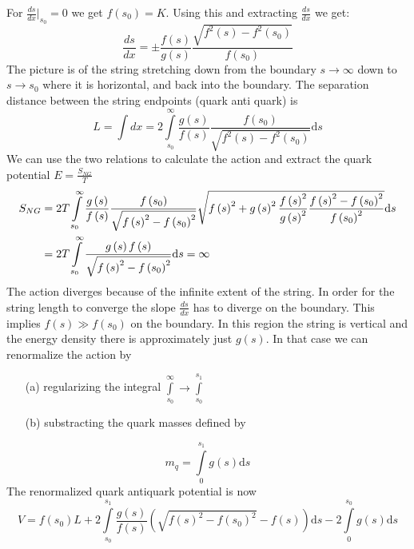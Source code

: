 \documentclass[11pt,a4paper]{article}
\begin{document}
For $\frac{ds}{dx}|_{s_0}=0$ we get $f\left(s_0\right)=K$. Using this and extracting $\frac{ds}{dx}$ we get:
\begin{equation}
\frac{ds}{dx}=\pm\frac{f\left(s\right)}{g\left(s\right)} \frac{\sqrt{f^2\left(s\right)-f^2\left(s_0\right)}}{f\left(s_0\right)}
\end{equation}
The picture is of the string stretching down from the boundary $s\rightarrow\infty$ down to $s\rightarrow s_0$ where it is horizontal, and back into the boundary. The separation distance between the string endpoints (quark anti quark) is
\begin{equation}
\label{eq:stringseperation}
L=\int dx=2\int\limits_{s_0}^{\infty} \frac{g\left(s\right)}{f\left(s\right)} \frac{f\left(s_0\right)}{\sqrt{f^2\left(s\right)-f^2\left(s_0\right)}} \mathrm{d}s
\end{equation}
We can use the two relations to calculate the action and extract the quark potential $E=\frac{S_{NG}}{T}$
\begin{align}
S_{NG}&=2T\int\limits_{s_0}^{\infty} \frac{g\left(s\right)}{f\left(s\right)} \frac{f\left(s_0\right)}{\sqrt{f\left(s\right)^2-f\left(s_0\right)^2}} \sqrt{f\left(s\right)^2+g\left(s\right)^2\frac{f\left(s\right)^2}{g\left(s\right)^2} \frac{f\left(s\right)^2-f\left(s_0\right)^2}{f\left(s_0\right)^2}}\mathrm{d}s \notag \\
&=2T\int\limits_{s_0}^{\infty} \frac{g\left(s\right)f\left(s\right)}{\sqrt{f\left(s\right)^2-f\left(s_0\right)^2}}\mathrm{d}s=\infty
\end{align}
The action diverges because of the infinite extent of the string. In order for the string length to converge the slope $\frac{ds}{dx}$ has to diverge on the boundary. This implies $f\left(s\right)\gg f\left(s_0\right)$ on the boundary. In this region the string is vertical and the energy density there is approximately just $g\left(s\right)$. In that case we can renormalize the action by
\begin{itemize}
\item[(a)] regularizing the integral $\int\limits_{s_0}^{\infty} \rightarrow \int\limits_{s_0}^{s_1}$
\item[(b)] substracting the quark masses defined by
\end{itemize}
\begin{equation}
m_q=\int\limits_{0}^{s_1}g\left(s\right)\mathrm{d}s
\end{equation}
The renormalized quark antiquark potential is now
\begin{equation}
V=f\left(s_0\right)L+2\int\limits_{s_0}^{s_1} \frac{g\left(s\right)}{f\left(s\right)}\left(\sqrt{f\left(s\right)^2-f\left(s_0\right)^2}-f\left(s\right)\right)\mathrm{d}s-2\int\limits_{0}^{s_0}g\left(s\right)\mathrm{d}s
\end{equation}
\end{document}
